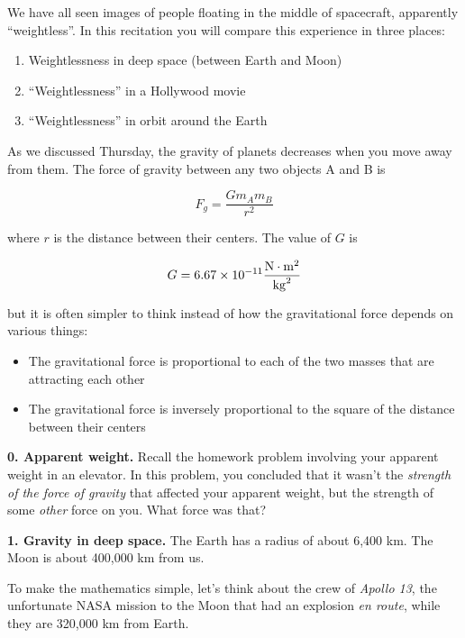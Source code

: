 \documentclass[12pt]{article}
\begin{document}
\Large
\centerline{}
\normalsize
\centerline{}

We have all seen images of people floating in the middle of spacecraft, apparently ``weightless''. In this recitation you will compare this experience in three places:

\begin{enumerate}
	\item Weightlessness in deep space (between Earth and Moon)
	\item ``Weightlessness'' in a Hollywood movie
	\item ``Weightlessness'' in orbit around the Earth
\end{enumerate}

As we discussed Thursday, the gravity of planets decreases when you move away from them. The force of gravity between any two objects A and B is

$$F_g = \frac{Gm_Am_B}{r^2}$$

where $r$ is the distance between their centers. The value of $G$ is

$$G = 6.67 \times 10^{-11} \frac{\rm N \cdot \rm m^2}{{\rm kg}^2}$$

but it is often simpler to think instead of how the gravitational force depends on various things:

\begin{itemize}
	\item The gravitational force is proportional to each of the two masses that are attracting each other
	\item The gravitational force is inversely proportional to the square of the distance between their centers
\end{itemize}


{\bf 0. Apparent weight.} Recall the homework problem involving your apparent weight in an elevator. In this problem, you concluded that it wasn't the {\it strength of the force of gravity} that affected your apparent weight, but the strength of some {\it other} force on you. What force was that?

\vspace{1in}
\newpage

{\bf 1. Gravity in deep space.} The Earth has a radius of about 6,400 km. The Moon is about 400,000 km from us.

To make the mathematics simple, let's think about the crew of {\it Apollo 13}, the unfortunate NASA mission to the Moon that had an explosion {\it en route}, while they are 320,000 km from Earth.
\end{document}
